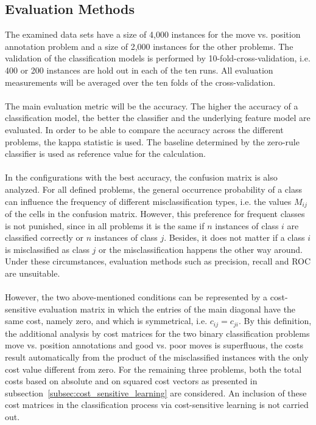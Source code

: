 \documentclass[article,type=msc,colorback,accentcolor=tud7b]{tudthesis}
\begin{document}
  \subsection{Evaluation Methods}    
  \label{subsec:evaluation_methods}
    The examined data sets have a size of 4,000 instances for the move vs. position annotation problem and a size of 2,000 instances for the other problems. The validation of the classification models is performed by 10-fold-cross-validation, i.e. 400 or 200 instances are hold out in each of the ten runs. All evaluation measurements will be averaged over the ten folds of the cross-validation. \\\\
    The main evaluation metric will be the accuracy. The higher the accuracy of a classification model, the better the classifier and the underlying feature model are evaluated. In order to be able to compare the accuracy across the different problems, the kappa statistic is used. The baseline determined by the zero-rule classifier is used as reference value for the calculation. \\\\
    In the configurations with the best accuracy, the confusion matrix is also analyzed. For all defined problems, the general occurrence probability of a class can influence the frequency of different misclassification types, i.e. the values $M_{ij}$ of the cells in the confusion matrix. However, this preference for frequent classes is not punished, since in all problems it is the same if $n$ instances of class $i$ are classified correctly or $n$ instances of class $j$. Besides, it does not matter if a class $i$ is misclassified as class $j$ or the misclassification happens the other way around. Under these circumstances, evaluation methods such as precision, recall and ROC are unsuitable. \\\\
However, the two above-mentioned conditions can be represented by a cost-sensitive evaluation matrix in which the entries of the main diagonal have the same cost, namely zero, and which is symmetrical, i.e. $c_{ij}=c_{ji}$. By this definition, the additional analysis by cost matrices for the two binary classification problems move vs. position annotations and good vs. poor moves is superfluous, the costs result automatically from the product of the misclassified instances with the only cost value different from zero. For the remaining three problems, both the total costs based on absolute and on squared cost vectors as presented in subsection~\ref{subsec:cost_sensitive_learning} are considered. An inclusion of these cost matrices in the classification process via cost-sensitive learning is not carried out.
  \clearpage  
  
\end{document}
